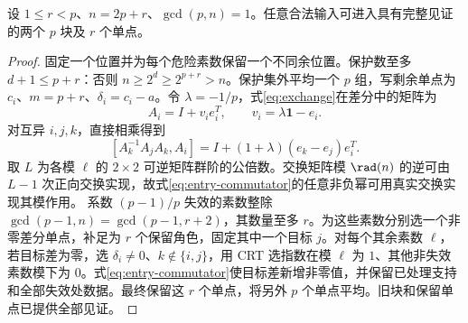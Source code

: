 \begin{lemma}\label{lem:two-block-entry}
设 $1\le r<p$、$n=2p+r$、$\gcd(p,n)=1$。任意合法输入可进入具有完整见证的两个 $p$ 块及 $r$ 个单点。
\end{lemma}
\begin{proof}
固定一个位置并为每个危险素数保留一个不同余位置。保护数至多 $d+1\le p+r$：否则 $n\ge2^d\ge2^{p+r}>n$。保护集外平均一个 $p$ 组，写剩余单点为 $c_i$、$m=p+r$、$\delta_i=c_i-a$。令 $\lambda=-1/p$，式\eqref{eq:exchange}在差分中的矩阵为
\[
A_i=I+v_i e_i^T,\qquad v_i=\lambda\mathbf1-e_i.
\]
对互异 $i,j,k$，直接相乘得到
\begin{equation}\label{eq:entry-commutator}
[A_k^{-1}A_jA_k,A_i]
=I+(1+\lambda)(e_k-e_j)e_i^T.
\end{equation}
取 $L$ 为各模 $\ell$ 的 $2\times2$ 可逆矩阵群阶的公倍数。交换矩阵模 $\rad(n)$ 的逆可由 $L-1$ 次正向交换实现，故式\eqref{eq:entry-commutator}的任意非负幂可用真实交换实现其模作用。
系数 $(p-1)/p$ 失效的素数整除 $\gcd(p-1,n)=\gcd(p-1,r+2)$，其数量至多 $r$。为这些素数分别选一个非零差分单点，补足为 $r$ 个保留角色，固定其中一个目标 $j$。对每个其余素数 $\ell$，若目标差为零，选 $\delta_i\ne0$、$k\notin\{i,j\}$，用 CRT 选指数在模 $\ell$ 为 $1$、其他非失效素数模下为 $0$。式\eqref{eq:entry-commutator}使目标差新增非零值，并保留已处理支持和全部失效处数据。最终保留这 $r$ 个单点，将另外 $p$ 个单点平均。旧块和保留单点已提供全部见证。
\end{proof}

